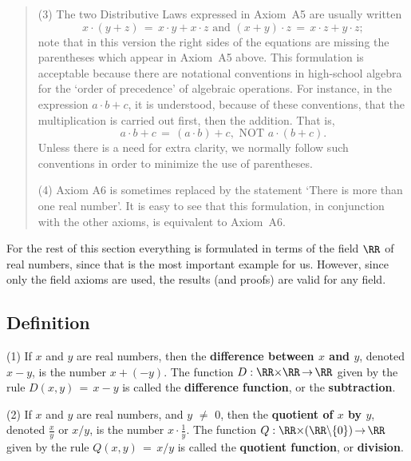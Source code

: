 \begin{quotation}
{        (3) The two Distributive Laws expressed in Axiom~A5 are usually written
        \begin{displaymath}
        x{\cdot}(y+z) \,=\, x{\cdot}y + x{\cdot}z \mbox{ and } 
        (x+y){\cdot}z \,=\, x{\cdot}z + y{\cdot}z;
        \end{displaymath}
    note that in this version the right sides of the equations are missing the parentheses which appear in Axiom~A5 above.
    This formulation is acceptable because there are notational conventions in high-school algebra for the `order of precedence' of algebraic operations.
    For instance, in the expression $a{\cdot}b+c$, it is understood, because of these conventions,
    that the multiplication is carried out first, then the addition.
    That is,
        \begin{displaymath}
        a{\cdot}b+c \,=\, (a{\cdot}b) + c, \mbox{ NOT } a{\cdot}(b+c).
        \end{displaymath}
    Unless there is a need for extra clarity, we normally follow such conventions in order to minimize the use of parentheses.

\V

        (4) Axiom A6 is sometimes replaced by the statement `There is more than one real number'.
    It is easy to see that this formulation, in conjunction with the other axioms, is equivalent to Axiom~A6.
}%
\end{quotation}

\VV

        For the rest of this section everything is formulated in terms of the field ${\RR}$ of real numbers, since that is the most important example for us.
    However, since only the field axioms are used, the results (and proofs) are valid for any field.


        \subsection{\small{{\bf Definition}}}
        \label{DefB10.22}

\hspace*{\parindent} (1) If $x$ and $y$ are real numbers, then the {\bf difference between $x$ and $y$}, denoted $x-y$, is the number $x+(-y)$.
    The function $D:{\RR}{\times}{\RR} \,{\rightarrow}\, {\RR}$ given by the rule
    $D(x,y) \,=\, x-y$ is called the {\bf difference function}, or the {\bf subtraction}.

\V

        (2) If $x$ and $y$ are real numbers, and $y \,\,{\neq}\,\, 0$, then the {\bf quotient of $x$ by $y$}, denoted ${\displaystyle \frac{x}{y}}$ or $x/y$, is the number $x{\cdot}{\displaystyle \frac{1}{y}}$.
    The function $Q:{\RR}{\times}({\RR}{\setminus}\{0\}) \,{\rightarrow}\, {\RR}$ given by the rule $Q(x,y) \,=\, x/y$ is called the {\bf quotient function}, or {\bf division}.

